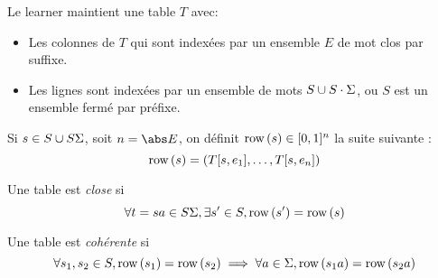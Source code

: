 Le learner maintient une table $T$ avec:

\begin{itemize}
	\item Les colonnes de $T$ qui sont indexées par un ensemble $E$ de mot clos par suffixe.
	\item Les lignes sont indexées par un ensemble de mots $S \cup S\cdot \Sigma$, ou $S$ est
	      un ensemble fermé par préfixe.
\end{itemize}


\begin{definition}
	Si $s \in S \cup S\Sigma$, soit $n = \abs E$, on définit $\text{row}\left(s\right) \in [0,1]^n$ la suite suivante :
	$$ \text{row}\left(s\right) = (T[s,e_1], \ldots, T[s, e_n])$$
\end{definition}

\begin{definition}
	Une table est \emph{close} si
	$$ \forall t = sa \in S\Sigma, \exists s'\in S, \text{row}\left(s'\right) = \text{row}\left(s\right)$$
\end{definition}

\begin{definition}
	Une table est \emph{cohérente} si
	$$ \forall s_1, s_2 \in S, \text{row}\left(s_1\right) = \text{row}\left(s_2\right) \implies \forall a \in \Sigma, \text{row}\left(s_1a\right) = \text{row}\left(s_2a\right)$$
\end{definition}


